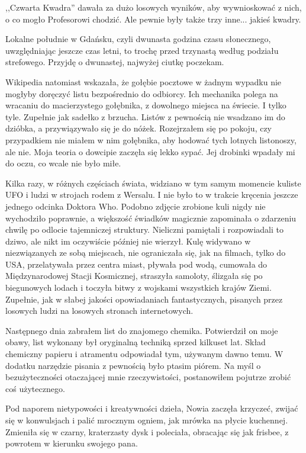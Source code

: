 ,,Czwarta Kwadra'' dawała za dużo losowych wyników, aby wywnioskować z nich, o co mogło Profesorowi chodzić.
Ale pewnie były także trzy inne... jakieś kwadry.

Lokalne południe w Gdańsku, czyli dwunasta godzina czasu słonecznego, uwzględniając jeszcze czas letni, to trochę przed trzynastą według podziału strefowego.
Przyjdę o dwunastej, najwyżej ciutkę poczekam.

Wikipedia natomiast wskazała, że gołębie pocztowe w żadnym wypadku nie mogłyby doręczyć listu bezpośrednio do odbiorcy.
Ich mechanika polega na wracaniu do macierzystego gołębnika, z dowolnego miejsca na świecie. I tylko tyle. Zupełnie jak sadełko z brzucha.
Listów z pewnością nie wsadzano im do dzióbka, a przywiązywało się je do nóżek.
Rozejrzałem się po pokoju, czy przypadkiem nie miałem w nim gołębnika, aby hodować tych lotnych listonoszy, ale nie.
Moja teoria o dowcipie zaczęła się lekko sypać. Jej drobinki wpadały mi do oczu, co wcale nie było miłe.

Kilka razy, w różnych częściach świata, widziano w tym samym momencie kuliste UFO i ludzi w strojach rodem z Wersalu. I nie było to w trakcie kręcenia jeszcze jednego odcinka Doktora Who.
Podobno zdjęcie zrobione kuli nigdy nie wychodziło poprawnie, a większość świadków magicznie zapominała o zdarzeniu chwilę po odlocie tajemniczej struktury.
Nieliczni pamiętali i rozpowiadali to dziwo, ale nikt im oczywiście później nie wierzył.
Kulę widywano w niezwiązanych ze sobą miejscach, nie ograniczała się, jak na filmach, tylko do USA, przelatywała przez centra miast, pływała pod wodą, cumowała do Międzynarodowej Stacji Kosmicznej, straszyła samoloty, ślizgała się po biegunowych lodach i toczyła bitwy z wojskami wszystkich krajów Ziemi. 
Zupełnie, jak w słabej jakości opowiadaniach fantastycznych, pisanych przez losowych ludzi na losowych stronach internetowych. 

Następnego dnia zabrałem list do znajomego chemika.
Potwierdził on moje obawy, list wykonany był oryginalną techniką sprzed kilkuset lat.
Skład chemiczny papieru i atramentu odpowiadał tym, używanym dawno temu.
W dodatku narzędzie pisania z pewnością było ptasim piórem.
Na myśl o bezużyteczności otaczającej mnie rzeczywistości, postanowiłem pojutrze zrobić coś użytecznego.

\divider{}

Pod naporem nietypowości i kreatywności dzieła, Nowia zaczęła krzyczeć, zwijać się w konwulsjach i palić mrocznym ogniem, jak mrówka na płycie kuchennej.
Zmieniła się w czarny, kraterzasty dysk i poleciała, obracając się jak frisbee, z powrotem w kierunku swojego pana.

